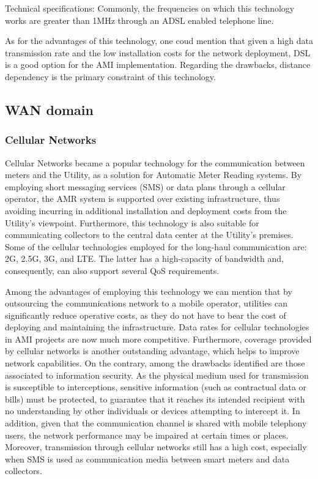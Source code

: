 \documentclass[11pt,draftclsnofoot,onecolumn]{IEEEtran}
\begin{document}
Technical specifications: Commonly, the frequencies on which this technology works are greater than 1MHz through an ADSL enabled telephone line. 

As for the advantages of this technology, one coud mention that given a high data transmission rate and the low installation costs for the network deployment, DSL is a good option for the AMI implementation. Regarding the drawbacks, distance dependency is the primary constraint of this technology.

\subsection{WAN domain}

\subsubsection{Cellular Networks}\label{tech::cellular}
Cellular Networks became a popular technology for the communication between meters and the Utility, as a solution for Automatic Meter Reading systems. By employing short messaging services (SMS) or data plans through a cellular operator, the AMR system is supported over existing infrastructure, thus avoiding incurring in additional installation and deployment costs from the Utility's viewpoint. Furthermore, this technology is also suitable for communicating collectors to the central data center at the Utility's premises. Some of the cellular technologies employed for the long-haul communication are: 2G, 2.5G, 3G, and LTE. The latter has a high-capacity of bandwidth and, consequently, can also support several QoS requirements.

Among the advantages of employing this technology we can mention that by outsourcing the communications network to a mobile operator, utilities can significantly reduce operative costs, as they do not have to bear the cost of deploying and maintaining the infrastructure. Data rates for cellular technologies in AMI projects are now much more competitive. Furthermore, coverage provided by cellular networks is another outstanding advantage, which helps to improve network capabilities. On the contrary, among the drawbacks identified are those associated to information security. As the physical medium used for transmission is susceptible to interceptions, sensitive information (such as contractual data or bills) must be protected, to guarantee that it reaches its intended recipient with no understanding by other individuals or devices attempting to intercept it. In addition, given that the communication channel is shared with mobile telephony users, the network performance may be impaired at certain times or places. Moreover, transmission through cellular networks still has a high cost, especially when SMS is used as communication media between smart meters and data collectors. 
\end{document}
